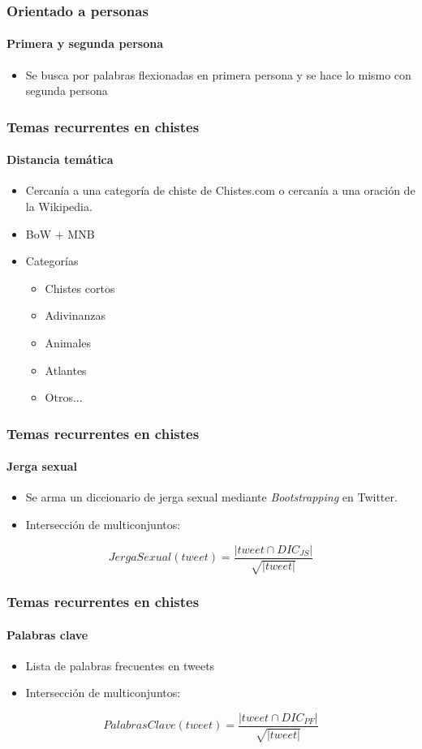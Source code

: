 \begin{frame}
    \frametitle{Orientado a personas}
    \framesubtitle{Primera y segunda persona}

    \begin{itemize}
        \item Se busca por palabras flexionadas en primera persona y se hace lo mismo con segunda persona
    \end{itemize}
\end{frame}

\begin{frame}
    \frametitle{Temas recurrentes en chistes}
    \framesubtitle{Distancia temática}

    \begin{itemize}
        \item Cercanía a una categoría de chiste de Chistes.com o cercanía a una oración de la Wikipedia.
        \item BoW + MNB
        \item Categorías
        \begin{itemize}
            \item Chistes cortos
            \item Adivinanzas
            \item Animales
            \item Atlantes
            \item Otros...
        \end{itemize}
    \end{itemize}
\end{frame}

\begin{frame}
    \frametitle{Temas recurrentes en chistes}
    \framesubtitle{Jerga sexual}

    \begin{itemize}
        \item Se arma un diccionario de jerga sexual mediante \emph{Bootstrapping} en Twitter.
        \item Intersección de multiconjuntos:
    \end{itemize}

    \begin{center}
        \[
            JergaSexual(tweet) = \frac{|tweet \cap DIC_{JS}|}{\sqrt{|tweet|}}
        \]
    \end{center}
\end{frame}

\begin{frame}
    \frametitle{Temas recurrentes en chistes}
    \framesubtitle{Palabras clave}

    \begin{itemize}
        \item Lista de palabras frecuentes en tweets
        \item Intersección de multiconjuntos:
    \end{itemize}

    \begin{center}
        \[
            PalabrasClave(tweet) = \frac{|tweet \cap DIC_{PF}|}{\sqrt{|tweet|}}
        \]
    \end{center}
\end{frame}

